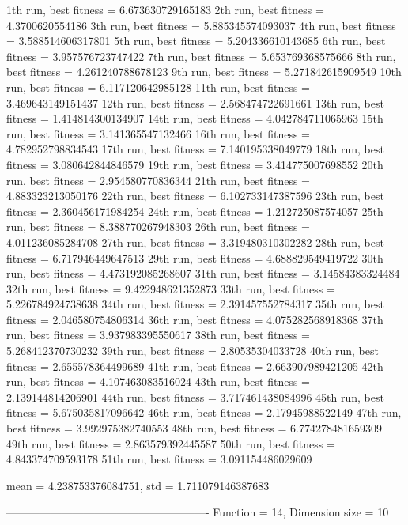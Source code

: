 1th run, best fitness = 6.673630729165183
2th run, best fitness = 4.3700620554186
3th run, best fitness = 5.885345574093037
4th run, best fitness = 3.588514606317801
5th run, best fitness = 5.204336610143685
6th run, best fitness = 3.957576723747422
7th run, best fitness = 5.653769368575666
8th run, best fitness = 4.261240788678123
9th run, best fitness = 5.271842615909549
10th run, best fitness = 6.117120642985128
11th run, best fitness = 3.469643149151437
12th run, best fitness = 2.568474722691661
13th run, best fitness = 1.414814300134907
14th run, best fitness = 4.042784711065963
15th run, best fitness = 3.141365547132466
16th run, best fitness = 4.782952798834543
17th run, best fitness = 7.140195338049779
18th run, best fitness = 3.080642844846579
19th run, best fitness = 3.414775007698552
20th run, best fitness = 2.954580770836344
21th run, best fitness = 4.883323213050176
22th run, best fitness = 6.102733147387596
23th run, best fitness = 2.360456171984254
24th run, best fitness = 1.212725087574057
25th run, best fitness = 8.388770267948303
26th run, best fitness = 4.011236085284708
27th run, best fitness = 3.319480310302282
28th run, best fitness = 6.717946449647513
29th run, best fitness = 4.688829549419722
30th run, best fitness = 4.473192085268607
31th run, best fitness = 3.14584383324484
32th run, best fitness = 9.422948621352873
33th run, best fitness = 5.226784924738638
34th run, best fitness = 2.391457552784317
35th run, best fitness = 2.046580754806314
36th run, best fitness = 4.075282568918368
37th run, best fitness = 3.937983395550617
38th run, best fitness = 5.268412370730232
39th run, best fitness = 2.80535304033728
40th run, best fitness = 2.655578364499689
41th run, best fitness = 2.663907989421205
42th run, best fitness = 4.107463083516024
43th run, best fitness = 2.139144814206901
44th run, best fitness = 3.717461438084996
45th run, best fitness = 5.675035817096642
46th run, best fitness = 2.17945988522149
47th run, best fitness = 3.992975382740553
48th run, best fitness = 6.774278481659309
49th run, best fitness = 2.863579392445587
50th run, best fitness = 4.843374709593178
51th run, best fitness = 3.091154486029609

mean = 4.238753376084751, std = 1.711079146387683

-------------------------------------------------------
Function = 14, Dimension size = 10

